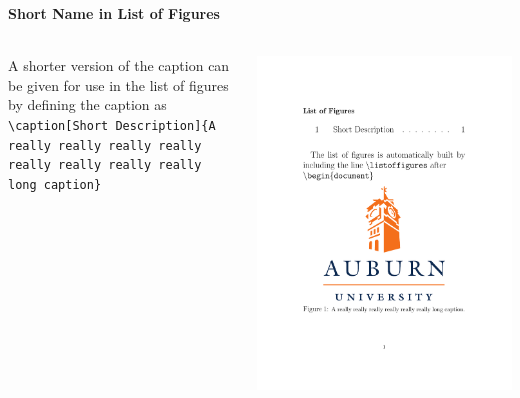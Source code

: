 \documentclass[article]{beamer}
\begin{document}
\begin{frame}
  \frametitle{\thesubsection}
  \framesubtitle{Short Name in List of Figures}
  \begin{columns}
    \begin{column}{0.5\textwidth}
      A shorter version of the caption can be given for use in the list of
      figures by defining the caption as \\\texttt{\textbackslash caption[Short
      Description]\{A really really really really really really really really
      long caption\}}
    \end{column}
    \begin{column}{0.5\textwidth}
      \colorbox{white}{\includegraphics[height=0.9\textheight]{list_of_figures_short_description_example.pdf}}
    \end{column}
  \end{columns}
\end{frame}
\end{document}

